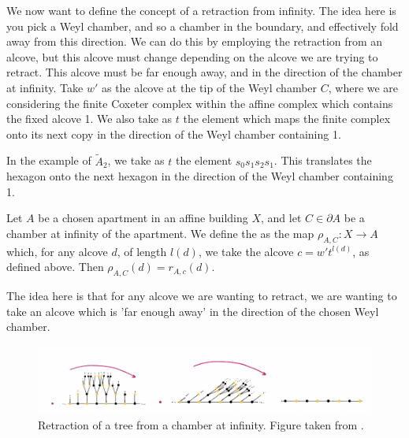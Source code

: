 \documentclass[11pt]{article}
\begin{document}
We now want to define the concept of a retraction from infinity. The idea here is you pick a Weyl chamber, and so a chamber in the boundary, and effectively fold away from this direction. We can do this by employing the retraction from an alcove, but this alcove must change depending on the alcove we are trying to retract. This alcove must be far enough away, and in the direction of the chamber at infinity. Take $w'$ as the alcove at the tip of the Weyl chamber $C$, where we are considering the finite Coxeter complex within the affine complex which contains the fixed alcove 1. We also take as $t$ the element which maps the finite complex onto its next copy in the direction of the Weyl chamber containing 1. 


In the example of $\tilde{A}_2$, we take as $t$ the element $s_0s_1s_2s_1$. This translates the hexagon onto the next hexagon in the direction of the Weyl chamber containing 1. 

\begin{definition}
    Let $A$ be a chosen apartment in an affine building $X$, and let $C\in \partial A$ be a chamber at infinity of the apartment. We define the  as the map $\rho_{A,C}:X\longrightarrow A$ which, for any alcove $d$, of length $l(d)$, we take the alcove $c=w't^{l(d)}$, as defined above. Then $\rho_{A,C}(d)=r_{A,c}(d)$.
    
\end{definition}
The idea here is that for any alcove we are wanting to retract, we are wanting to take an alcove which is 'far enough away' in the direction of the chosen Weyl chamber. 
\begin{figure}[!htbp]
    \begin{center}
    \includegraphics[scale=0.6]{Screenshot 2023-04-18 at 14.53.25.png}
    \end{center}
    \caption{Retraction of a tree from a chamber at infinity. Figure taken from \cite[p.26]{WILD}.}
\end{figure}
\end{document}

